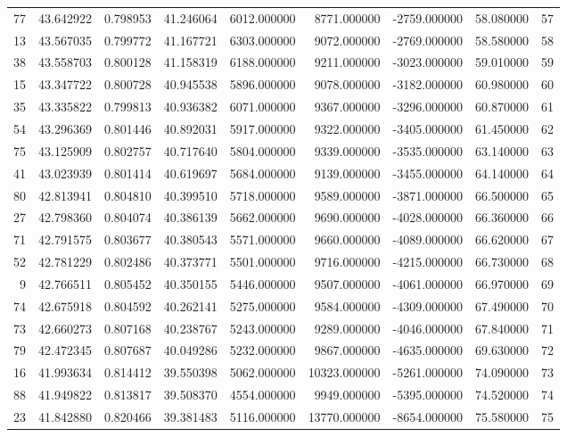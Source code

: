 \begin{tabular}{rrrrrrrrr}
77 & 43.642922 & 0.798953 & 41.246064 & 6012.000000 & 8771.000000 & -2759.000000 & 58.080000 & 57 \\
13 & 43.567035 & 0.799772 & 41.167721 & 6303.000000 & 9072.000000 & -2769.000000 & 58.580000 & 58 \\
38 & 43.558703 & 0.800128 & 41.158319 & 6188.000000 & 9211.000000 & -3023.000000 & 59.010000 & 59 \\
15 & 43.347722 & 0.800728 & 40.945538 & 5896.000000 & 9078.000000 & -3182.000000 & 60.980000 & 60 \\
35 & 43.335822 & 0.799813 & 40.936382 & 6071.000000 & 9367.000000 & -3296.000000 & 60.870000 & 61 \\
54 & 43.296369 & 0.801446 & 40.892031 & 5917.000000 & 9322.000000 & -3405.000000 & 61.450000 & 62 \\
75 & 43.125909 & 0.802757 & 40.717640 & 5804.000000 & 9339.000000 & -3535.000000 & 63.140000 & 63 \\
41 & 43.023939 & 0.801414 & 40.619697 & 5684.000000 & 9139.000000 & -3455.000000 & 64.140000 & 64 \\
80 & 42.813941 & 0.804810 & 40.399510 & 5718.000000 & 9589.000000 & -3871.000000 & 66.500000 & 65 \\
27 & 42.798360 & 0.804074 & 40.386139 & 5662.000000 & 9690.000000 & -4028.000000 & 66.360000 & 66 \\
71 & 42.791575 & 0.803677 & 40.380543 & 5571.000000 & 9660.000000 & -4089.000000 & 66.620000 & 67 \\
52 & 42.781229 & 0.802486 & 40.373771 & 5501.000000 & 9716.000000 & -4215.000000 & 66.730000 & 68 \\
9 & 42.766511 & 0.805452 & 40.350155 & 5446.000000 & 9507.000000 & -4061.000000 & 66.970000 & 69 \\
74 & 42.675918 & 0.804592 & 40.262141 & 5275.000000 & 9584.000000 & -4309.000000 & 67.490000 & 70 \\
73 & 42.660273 & 0.807168 & 40.238767 & 5243.000000 & 9289.000000 & -4046.000000 & 67.840000 & 71 \\
79 & 42.472345 & 0.807687 & 40.049286 & 5232.000000 & 9867.000000 & -4635.000000 & 69.630000 & 72 \\
16 & 41.993634 & 0.814412 & 39.550398 & 5062.000000 & 10323.000000 & -5261.000000 & 74.090000 & 73 \\
88 & 41.949822 & 0.813817 & 39.508370 & 4554.000000 & 9949.000000 & -5395.000000 & 74.520000 & 74 \\
23 & 41.842880 & 0.820466 & 39.381483 & 5116.000000 & 13770.000000 & -8654.000000 & 75.580000 & 75 \\

\end{tabular}
